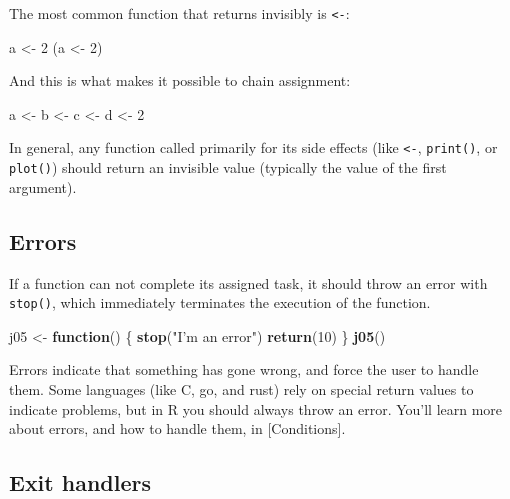 \documentclass[]{book}
\newenvironment{Shaded}{\begin{snugshade}}{\end{snugshade}}
\newcommand{\ControlFlowTok}[1]{\textcolor[rgb]{0.13,0.29,0.53}{\textbf{#1}}}
\newcommand{\DecValTok}[1]{\textcolor[rgb]{0.00,0.00,0.81}{#1}}
\newcommand{\KeywordTok}[1]{\textcolor[rgb]{0.13,0.29,0.53}{\textbf{#1}}}
\newcommand{\NormalTok}[1]{#1}
\newcommand{\StringTok}[1]{\textcolor[rgb]{0.31,0.60,0.02}{#1}}
\theoremstyle{definition}
\theoremstyle{definition}
\theoremstyle{definition}
\theoremstyle{remark}
\begin{document}
The most common function that returns invisibly is
\texttt{\textless{}-}:

\begin{Shaded}
\begin{Highlighting}[]
\NormalTok{a <-}\StringTok{ }\DecValTok{2}
\NormalTok{(a <-}\StringTok{ }\DecValTok{2}\NormalTok{)}
\end{Highlighting}
\end{Shaded}

And this is what makes it possible to chain assignment:

\begin{Shaded}
\begin{Highlighting}[]
\NormalTok{a <-}\StringTok{ }\NormalTok{b <-}\StringTok{ }\NormalTok{c <-}\StringTok{ }\NormalTok{d <-}\StringTok{ }\DecValTok{2}
\end{Highlighting}
\end{Shaded}

In general, any function called primarily for its side effects (like
\texttt{\textless{}-}, \texttt{print()}, or \texttt{plot()}) should
return an invisible value (typically the value of the first argument).

\hypertarget{errors}{%
\subsection{Errors}\label{errors}}

If a function can not complete its assigned task, it should throw an
error with \texttt{stop()}, which immediately terminates the execution
of the function.

\begin{Shaded}
\begin{Highlighting}[]
\NormalTok{j05 <-}\StringTok{ }\ControlFlowTok{function}\NormalTok{() \{}
  \KeywordTok{stop}\NormalTok{(}\StringTok{"I'm an error"}\NormalTok{)}
  \KeywordTok{return}\NormalTok{(}\DecValTok{10}\NormalTok{)}
\NormalTok{\}}
\KeywordTok{j05}\NormalTok{()}
\end{Highlighting}
\end{Shaded}

Errors indicate that something has gone wrong, and force the user to
handle them. Some languages (like C, go, and rust) rely on special
return values to indicate problems, but in R you should always throw an
error. You'll learn more about errors, and how to handle them, in
{[}Conditions{]}.

\hypertarget{on-exit}{%
\subsection{Exit handlers}\label{on-exit}}
\end{document}
